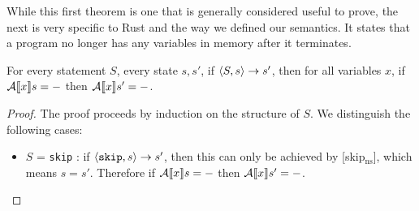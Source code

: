 While this first theorem is one that is generally considered useful to prove, the next is very specific to Rust and the way we defined our semantics. It states that a program no longer has any variables in memory after it terminates. 

\begin{theorem}
For every statement $S$, every state $s, s'$, if $\langle S, s \rangle \to s'$, then for all variables $x$, if $\mathcal{A} \llbracket x \rrbracket s = -$ then $\mathcal{A} \llbracket x \rrbracket s' = -$.
\end{theorem}

\begin{proof}
The proof proceeds by induction on the structure of $S$. We distinguish the following cases:
\begin{itemize}[noitemsep]

    \item $S$ = \texttt{skip} : if $\langle \texttt{skip}, s \rangle \to s'$, then this can only be achieved by [skip$_{\textrm{ns}}$], which means $s=s'$. Therefore if $\mathcal{A} \llbracket x \rrbracket s = -$ then $\mathcal{A} \llbracket x \rrbracket s' = -$. 
    

\end{itemize}
\end{proof}
